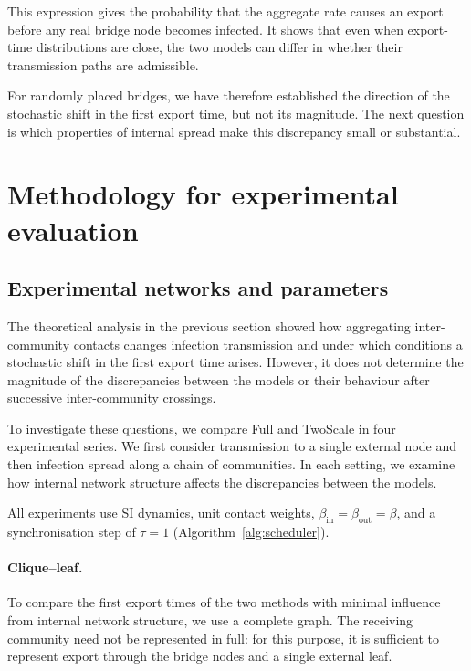 \documentclass{ieeeaccess}
\newcommand{\Full}{\textup{Full}}
\newcommand{\TS}{\textup{TwoScale}}
\begin{document}
This expression gives the probability that the aggregate rate causes an export before any real bridge node becomes infected. It shows that even when export-time distributions are close, the two models can differ in whether their transmission paths are admissible.

For randomly placed bridges, we have therefore established the direction of the stochastic shift in the first export time, but not its magnitude. The next question is which properties of internal spread make this discrepancy small or substantial.


\section{Methodology for experimental evaluation}
\label{sec:design}

\subsection{Experimental networks and parameters}

The theoretical analysis in the previous section showed how aggregating inter-community contacts changes infection transmission and under which conditions a stochastic shift in the first export time arises. However, it does not determine the magnitude of the discrepancies between the models or their behaviour after successive inter-community crossings.

To investigate these questions, we compare \Full{} and \TS{} in four experimental series. We first consider transmission to a single external node and then infection spread along a chain of communities. In each setting, we examine how internal network structure affects the discrepancies between the models.

All experiments use SI dynamics, unit contact weights, $\beta_{\mathrm{in}}=\beta_{\mathrm{out}}=\beta$, and a synchronisation step of $\tau=1$ (Algorithm~\ref{alg:scheduler}).

\paragraph{Clique--leaf.}
To compare the first export times of the two methods with minimal influence from internal network structure, we use a complete graph. The receiving community need not be represented in full: for this purpose, it is sufficient to represent export through the bridge nodes and a single external leaf.
\end{document}
